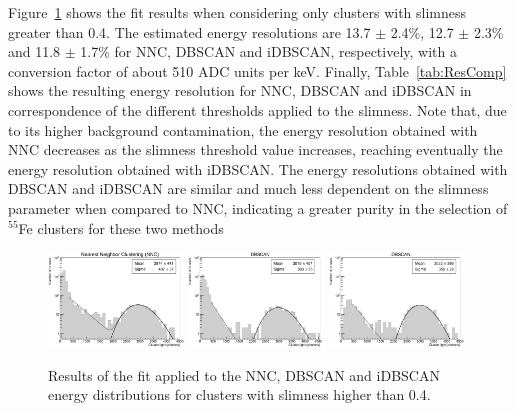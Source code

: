 \documentclass[a4paper,11pt]{article}
\begin{document}
Figure~\ref{fig_CosFe_slim} shows the fit results when considering only clusters with slimness greater than 0.4.
The estimated energy resolutions are 13.7 $\pm$ 2.4\%, 12.7 $\pm$ 2.3\% and 11.8 $\pm$ 1.7\% for NNC, DBSCAN and iDBSCAN, respectively, with a conversion factor of about 510 ADC units per keV.
Finally, Table~\ref{tab:ResComp} shows the resulting energy resolution for NNC, DBSCAN and iDBSCAN in correspondence of the different thresholds applied to the slimness.
Note that, due to its higher background contamination, the energy resolution obtained with NNC decreases as the slimness threshold value increases, reaching eventually the energy resolution obtained with iDBSCAN.
The energy resolutions obtained with DBSCAN and iDBSCAN are similar and much less dependent on the slimness parameter when compared to NNC, indicating a greater purity in the selection of $^{55}$Fe clusters for these two methods

\begin{figure}[ht]
\centering
\includegraphics[width=0.32\textwidth]{log_Resolution_NNC_4.pdf}
\includegraphics[width=0.32\textwidth]{log_Resolution_DBN_4.pdf}
\includegraphics[width=0.32\textwidth]{log_Resolution_IDB_4.pdf}
\caption{Results of the fit applied to the NNC, DBSCAN and iDBSCAN energy distributions for clusters with slimness higher than 0.4.} 
\label{fig_CosFe_slim}
\end{figure}
\end{document}

